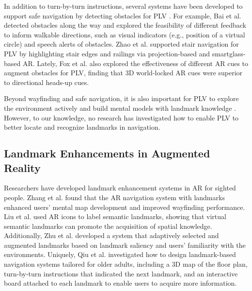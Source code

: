 In addition to turn-by-turn instructions, several systems have been developed to support safe navigation by detecting obstacles for PLV \cite{bai2017smart, zhao2019designing, da2021wearable, fox2023using}. For example, Bai et al. \cite{bai2017smart} detected obstacles along the way and explored the feasibility of different feedback to inform walkable directions, such as visual indicators (e.g., position of a virtual circle) and speech alerts of obstacles. Zhao et al. \cite{zhao2019designing} supported stair navigation for PLV by highlighting stair edges and railings via projection-based and smartglass-based AR. Lately, Fox et al. \cite{fox2023using} also explored the effectiveness of different AR cues to augment obstacles for PLV, finding that 3D world-locked AR cues were superior to directional heads-up cues.

Beyond wayfinding and safe navigation, it is also important for PLV to explore the environment actively \cite{chrastil2015active} and build mental models with landmark knowledge \cite{siegel1975development,kim2021acquisition}. However, to our knowledge, no research has investigated how to enable PLV to better locate and recognize landmarks in navigation.

\subsection{Landmark Enhancements in Augmented Reality}

Researchers have developed landmark enhancement systems in AR for sighted people. Zhang et al. \cite{zhang2021enhancing} found that the AR navigation system with landmarks enhanced users' mental map development and improved wayfinding performance. Liu et al. \cite{liu2021spatial} used AR icons to label semantic landmarks, showing that virtual semantic landmarks can promote the acquisition of spatial knowledge. Additionally, Zhu et al. \cite{zhu2022personalized} developed a system that adaptively selected and augmented landmarks based on landmark saliency and users' familiarity with the environments.
Uniquely, Qiu et al. \cite{qiu2023navmarkar} investigated how to design landmark-based navigation systems tailored for older adults, including a 3D map of the floor plan, turn-by-turn instructions that indicated the next landmark, and an interactive board attached to each landmark to enable users to acquire more information.%

